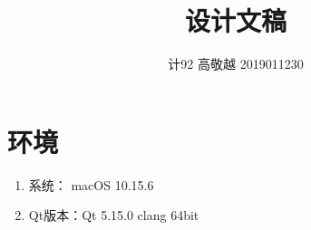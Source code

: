 \documentclass[utf-8]{ctexart}
\title{设计文稿}
\author{计92 高敬越 2019011230}
\begin{document}
    \maketitle
    \section{环境}
    \begin{enumerate}
        \item 系统： macOS 10.15.6
        \item Qt版本：Qt 5.15.0 clang 64bit 
    \end{enumerate}
        
\end{document}
